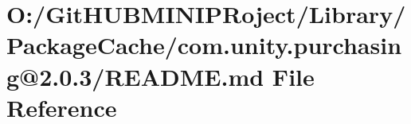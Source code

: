 \hypertarget{_library_2_package_cache_2com_8unity_8purchasing_0D2_80_83_2_r_e_a_d_m_e_8md}{}\section{O\+:/\+Git\+H\+U\+B\+M\+I\+N\+I\+P\+Roject/\+Library/\+Package\+Cache/com.unity.\+purchasing@2.0.3/\+R\+E\+A\+D\+ME.md File Reference}
\label{_library_2_package_cache_2com_8unity_8purchasing_0D2_80_83_2_r_e_a_d_m_e_8md}
